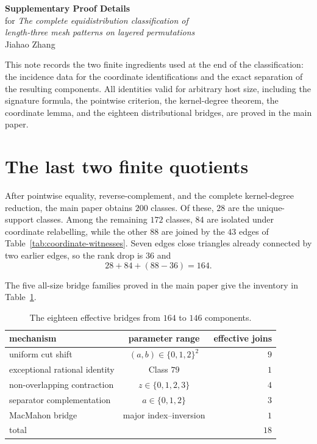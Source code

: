 \documentclass[10pt]{article}
\begin{document}
\begin{center}
{\Large\bfseries Supplementary Proof Details}\\[4pt]
{\large for \emph{The complete equidistribution classification of\\
length-three mesh patterns on layered permutations}}\\[7pt]
Jiahao Zhang
\end{center}

\noindent
This note records the two finite ingredients used at the end of the
classification: the incidence data for the coordinate identifications and
the exact separation of the resulting components.  All identities valid for
arbitrary host size, including the signature formula, the pointwise
criterion, the kernel-degree theorem, the coordinate lemma, and the eighteen
distributional bridges, are proved in the main paper.

\section{The last two finite quotients}

After pointwise equality, reverse-complement, and the complete
kernel-degree reduction, the main paper obtains $200$ classes.  Of these,
$28$ are the unique-support classes.  Among the remaining $172$ classes,
$84$ are isolated under coordinate relabelling, while the other $88$ are
joined by the $43$ edges of Table~\ref{tab:coordinate-witnesses}.  Seven
edges close triangles already connected by two earlier edges, so the rank
drop is $36$ and
\[
28+84+(88-36)=164.
\]

The five all-size bridge families proved in the main paper give the inventory
in Table~\ref{tab:bridge-inventory}.

\begin{table}[htbp]
\centering
\small
\caption{The eighteen effective bridges from $164$ to $146$ components.}
\label{tab:bridge-inventory}
\begin{tabular}{@{}l c r@{}}
\toprule
mechanism & parameter range & effective joins\\
\midrule
uniform cut shift & $(a,b)\in\{0,1,2\}^2$ & $9$\\
exceptional rational identity & Class $79$ & $1$\\
non-overlapping contraction & $z\in\{0,1,2,3\}$ & $4$\\
separator complementation & $a\in\{0,1,2\}$ & $3$\\
MacMahon bridge & major index--inversion & $1$\\
\midrule
total && $18$\\
\bottomrule
\end{tabular}
\end{table}
\end{document}
